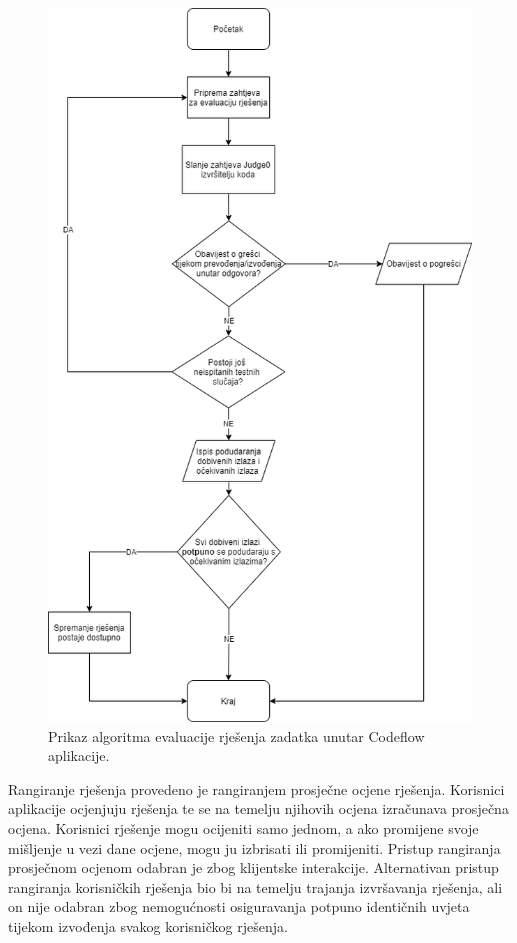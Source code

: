 \documentclass[times, utf8, zavrsni, numeric]{fer}
\begin{document}
	\begin{figure}[H]
		\centering
		\includegraphics[width=\linewidth]{pictures/prikazi/Algorithm.png}
		\caption{Prikaz algoritma evaluacije rješenja zadatka unutar Codeflow aplikacije.}
		\label{fig:algorithm}
	\end{figure}
	Rangiranje rješenja provedeno je rangiranjem prosječne ocjene rješenja. Korisnici aplikacije ocjenjuju rješenja te se na temelju njihovih ocjena izračunava prosječna ocjena. Korisnici rješenje mogu ocijeniti samo jednom, a ako promijene svoje mišljenje u vezi dane ocjene, mogu ju izbrisati ili promijeniti. Pristup rangiranja prosječnom ocjenom odabran je zbog klijentske interakcije. Alternativan pristup rangiranja korisničkih rješenja bio bi na temelju trajanja izvršavanja rješenja, ali on nije odabran zbog nemogućnosti osiguravanja potpuno identičnih uvjeta tijekom izvođenja svakog korisničkog rješenja.
	
\end{document}
